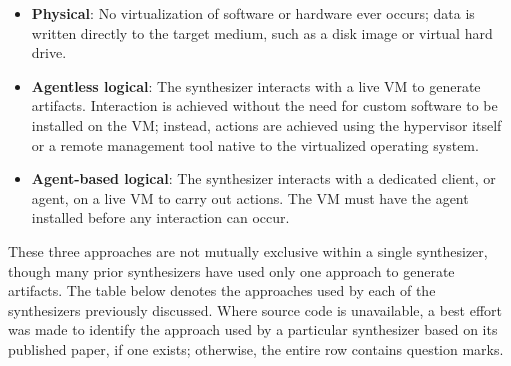 \documentclass[letterpaper,12pt]{report}
\def\tightlist{}
\begin{document}
\begin{itemize}
\tightlist
\item
  \textbf{Physical}: No virtualization of software or hardware ever
  occurs; data is written directly to the target medium, such as a disk
  image or virtual hard drive.
\item
  \textbf{Agentless logical}: The synthesizer interacts with a live VM
  to generate artifacts. Interaction is achieved without the need for
  custom software to be installed on the VM; instead, actions are
  achieved using the hypervisor itself or a remote management tool
  native to the virtualized operating system.
\item
  \textbf{Agent-based logical}: The synthesizer interacts with a
  dedicated client, or agent, on a live VM to carry out actions. The VM
  must have the agent installed before any interaction can occur.
\end{itemize}

These three approaches are not mutually exclusive within a single
synthesizer, though many prior synthesizers have used only one approach
to generate artifacts. The table below denotes the approaches used by
each of the synthesizers previously discussed. Where source code is
unavailable, a best effort was made to identify the approach used by a
particular synthesizer based on its published paper, if one exists;
otherwise, the entire row contains question marks.
\end{document}
